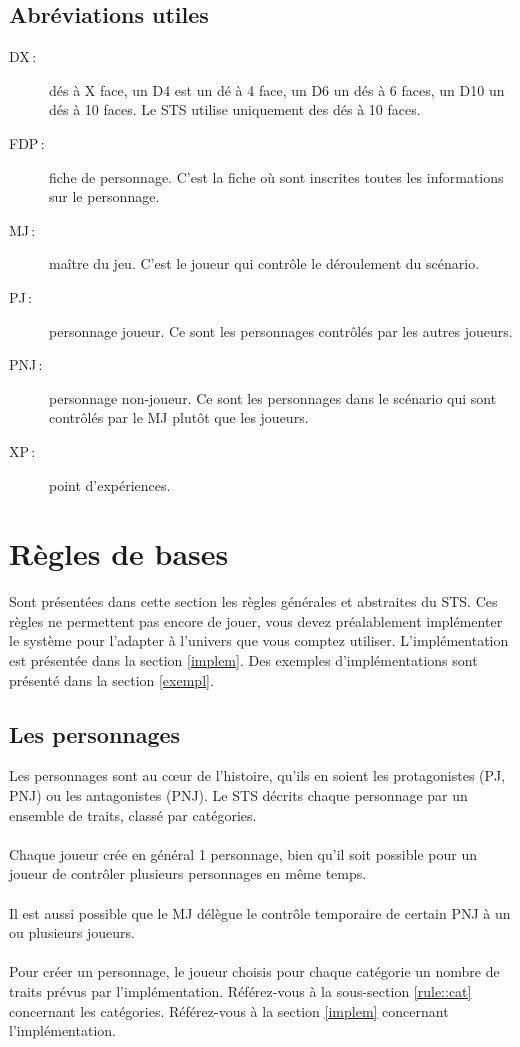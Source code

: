 \documentclass[a4paper,10pt,twoside,twocolumn]{article}
\begin{document}
 \subsection{Abréviations utiles}
 
\begin{description}
 \item[DX\,:] dés à X face, un D4 est un dé à 4 face, un D6 un dés à 6 faces, un D10 un dés à 10 faces. Le STS utilise uniquement des dés à 10 faces.
 \item[FDP\,:] fiche de personnage. C'est la fiche où sont inscrites toutes les informations sur le personnage.
 \item[MJ\,:] maître du jeu. C'est le joueur qui contrôle le déroulement du scénario.
 \item[PJ\,:] personnage joueur. Ce sont les personnages contrôlés par les autres joueurs.
 \item[PNJ\,:] personnage non-joueur. Ce sont les personnages dans le scénario qui sont contrôlés par le MJ plutôt que les joueurs.
 \item[XP\,:] point d'expériences.
\end{description}
 
 \section{Règles de bases}
 \label{rule}
 Sont présentées dans cette section les règles générales et abstraites du STS. Ces règles ne permettent pas encore de jouer, vous devez préalablement implémenter le système pour l'adapter à l'univers que vous comptez utiliser. L'implémentation est présentée dans la section \ref{implem}. Des exemples d'implémentations sont présenté dans la section \ref{exempl}.
 
 \subsection{Les personnages}
 \label{rule::char}
  Les personnages sont au cœur de l'histoire, qu'ils en soient les protagonistes (PJ, PNJ) ou les antagonistes (PNJ). Le STS décrits chaque personnage par un ensemble de traits, classé par catégories.\\
  \\
  Chaque joueur crée en général 1 personnage, bien qu'il soit possible pour un joueur de contrôler plusieurs personnages en même temps.\\
  \\
  Il est aussi possible que le MJ délègue le contrôle temporaire de certain PNJ à un ou plusieurs joueurs.\\
  \\
  Pour créer un personnage, le joueur choisis pour chaque catégorie un nombre de traits prévus par l'implémentation. Référez-vous à la sous-section \ref{rule::cat} concernant les catégories. Référez-vous à la section \ref{implem} concernant l'implémentation.\\
  \\
 
\end{document}
